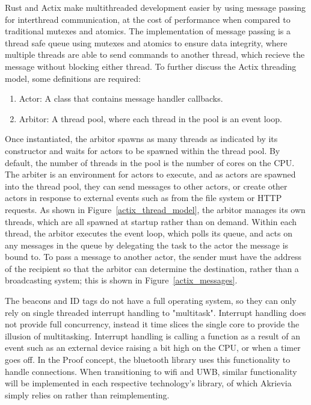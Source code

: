 \bigskip
Rust and Actix make multithreaded development easier by using message passing for interthread communication, at the cost of performance when compared to traditional mutexes and atomics.
The implementation of message passing is a thread safe queue using mutexes and atomics to ensure data integrity, where multiple threads are able to send commands to another thread, which recieve the message without blocking either thread.
To further discuss the Actix threading model, some definitions are required:
\begin{enumerate}
	\item Actor: A class that contains message handler callbacks.
	\item Arbitor: A thread pool, where each thread in the pool is an event loop.
\end{enumerate}
Once instantiated, the arbitor spawns as many threads as indicated by its constructor and waits for actors to be spawned within the thread pool.
By default, the number of threads in the pool is the number of cores on the CPU.
The arbiter is an environment for actors to execute, and as actors are spawned into the thread pool, they can send messages to other actors, or create other actors in response to external events such as from the file system or HTTP requests.
As shown in Figure~\ref{actix_thread_model}, the arbitor manages its own threads, which are all spawned at startup rather than on demand.
Within each thread, the arbitor executes the event loop, which polls its queue, and acts on any messages in the queue by delegating the task to the actor the message is bound to.
To pass a message to another actor, the sender must have the address of the recipient so that the arbitor can determine the destination, rather than a broadcasting system; this is shown in Figure~\ref{actix_messages}. 

\bigskip
The beacons and ID tags do not have a full operating system, so they can only rely on single threaded interrupt handling to "multitask".
Interrupt handling does not provide full concurrency, instead it time slices the single core to provide the illusion of multitasking.
Interrupt handling is calling a function as a result of an event such as an external device raising a bit high on the CPU, or when a timer goes off.
In the Proof concept, the bluetooth library uses this functionality to handle connections.
When transitioning to wifi and UWB, similar functionality will be implemented in each respective technology's library, of which Akrievia simply relies on rather than reimplementing.

